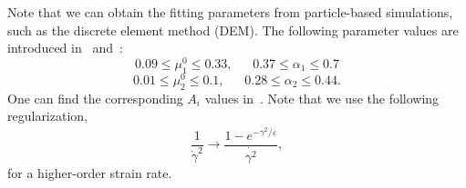 \noindent
Note that we can obtain the fitting parameters from particle-based simulations, such as the discrete element method (DEM). The following parameter values are introduced in~\cite{jop_constitutive_2006} and~\cite{srivastava_viscometric_2021}:
    \[
    0.09 \leq \mu_1^0 \leq 0.33, 
    \ \ \ \ \ \ \ 
    0.37 \leq \alpha_1 \leq 0.7
    \]
        \[
    0.01 \leq \mu_2^0 \leq 0.1, 
    \ \ \ \ \ \ \ 
    0.28 \leq \alpha_2 \leq 0.44.
    \]
One can find the corresponding $A_i$ values in~\cite{srivastava_viscometric_2021}.
Note that we use the following regularization,
\begin{equation}
  \frac{1}{\dot{\gamma}^2} \rightarrow \frac{1-e^{-\dot{\gamma^2} / \varepsilon}}{\dot{\gamma^2}},
\end{equation}
for a higher-order strain rate.
